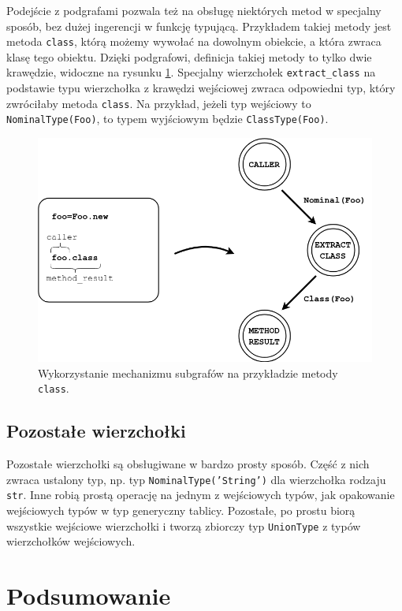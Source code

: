 \documentclass[declaration,shortabstract,mgr]{iithesis}
\begin{document}
Podejście z podgrafami pozwala też na obsługę niektórych metod w specjalny sposób, bez dużej ingerencji w funkcję typującą. Przykładem takiej metody jest metoda \texttt{class}, którą możemy wywołać na dowolnym obiekcie, a która zwraca klasę tego obiektu. Dzięki podgrafowi, definicja takiej metody to tylko dwie krawędzie, widoczne na rysunku \ref{fig:extract-class}. Specjalny wierzchołek \texttt{extract\_class} na podstawie typu wierzchołka z krawędzi wejściowej zwraca odpowiedni typ, który zwróciłaby metoda \texttt{class}. Na przykład, jeżeli typ wejściowy to \texttt{NominalType(Foo)}, to typem wyjściowym będzie \texttt{ClassType(Foo)}.

\begin{figure}[htb]
    \centering
    \includegraphics[scale=0.4]{imgs/extract-class.png}
    \caption{Wykorzystanie mechanizmu subgrafów na przykładzie metody \texttt{class}.}
    \label{fig:extract-class}
\end{figure}

\section{Pozostałe wierzchołki}

Pozostałe wierzchołki są obsługiwane w bardzo prosty sposób. Część z nich zwraca ustalony typ, np. typ \texttt{NominalType('String')} dla wierzchołka rodzaju \texttt{str}. Inne robią prostą operację na jednym z wejściowych typów, jak opakowanie wejściowych typów w typ generyczny tablicy. Pozostałe, po prostu biorą wszystkie wejściowe wierzchołki i tworzą zbiorczy typ \texttt{UnionType} z typów wierzchołków wejściowych.


\chapter{Podsumowanie}
\end{document}
